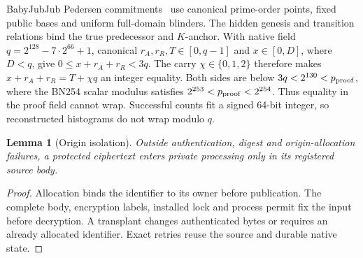 \documentclass[conference,compsoc]{IEEEtran}
\theoremstyle{definition}
\numberwithin{equation}{section}
\numberwithin{table}{section}
\numberwithin{figure}{section}
\theoremstyle{plain}
\newtheorem{lemma}{Lemma}[section]
\newtheorem{lemma}{Lemma}
\begin{document}
\label{app:native-interface}
BabyJubJub Pedersen commitments~\cite{Pedersen1991Commitment} use canonical
prime-order points, fixed public bases and uniform full-domain blinders.
The hidden genesis and transition relations bind the true predecessor and
\(K\)-anchor. With native field
\(q=2^{128}-7\cdot2^{66}+1\), canonical \(r_A,r_R,T\in[0,q-1]\)
and \(x\in[0,D]\), where \(D<q\), give
\(0\le x+r_A+r_R<3q\). The carry \(\chi\in\{0,1,2\}\) therefore
makes \(x+r_A+r_R=T+\chi q\) an integer equality. Both sides are below
\(3q<2^{130}<p_{\rm proof}\), where the BN254 scalar modulus satisfies
\(2^{253}<p_{\rm proof}<2^{254}\). Thus equality in the proof field
cannot wrap. Successful counts fit a signed 64-bit integer,
so reconstructed histograms do not wrap modulo \(q\).

\begin{lemma}[Origin isolation]
\label{lem:origin-isolation}
Outside authentication, digest and origin-allocation failures, a protected
ciphertext enters private processing only in its registered source body.
\end{lemma}
\begin{proof}
Allocation binds the identifier to its owner before publication. The complete
body, encryption labels, installed lock and process permit fix the input before
decryption. A transplant changes authenticated bytes or requires an already
allocated identifier. Exact retries reuse the source and durable native state.
\end{proof}
\end{document}
